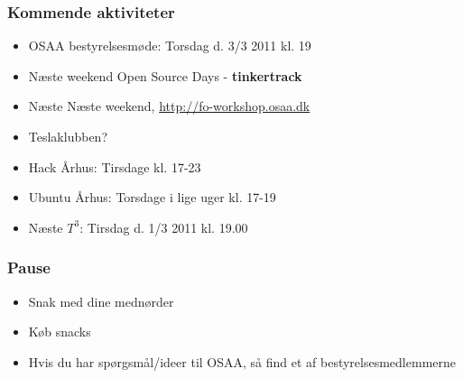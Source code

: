 \documentclass{beamer}
\begin{document}
\begin{frame}
  \frametitle{Kommende aktiviteter}
  \begin{itemize}
  \item OSAA bestyrelsesmøde: Torsdag d. 3/3 2011 kl. 19	 			
  \item Næste weekend Open Source Days - \textbf{tinkertrack}
  \item Næste Næste weekend, \url{http://fo-workshop.osaa.dk}
  \item Teslaklubben?
  \item Hack Århus: Tirsdage kl. 17-23	       	
  \item Ubuntu Århus: Torsdage i lige uger kl. 17-19 
  \item Næste ${T^3}$: Tirsdag d. 1/3 2011 kl. 19.00
  \end{itemize}						
\end{frame}

\begin{frame}
  \frametitle{Pause}
  \begin{itemize}
  \item Snak med dine mednørder		
  \item Køb snacks 
  \item Hvis du har spørgsmål/ideer til OSAA, så find et af bestyrelsesmedlemmerne
  \end{itemize}	
\end{frame}




%       

\end{document}
